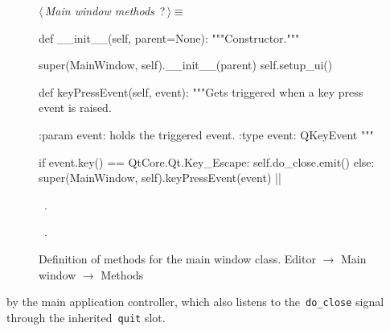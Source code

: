 \documentclass[%
    a4paper,    %
    justified,  %
    nobib,      %
    openany     %
]{tufte-book}
\makeatletter
\renewcommand{\label}[1]{\@tufte@label{##1}}%
\makeatother
\begin{document}
\begin{figure}
\begin{flushleft} \small
\begin{minipage}{\linewidth}\label{scrap17}\raggedright\small
{} $\langle\,${\itshape Main window methods}\nobreak\ {\footnotesize {?}}$\,\rangle\equiv$
\vspace{-1ex}
\begin{pythoncode}
def __init__(self, parent=None):
    """Constructor."""

    super(MainWindow, self).__init__(parent)
    self.setup_ui()

def keyPressEvent(self, event):
    """Gets triggered when a key press event is raised.

    :param event: holds the triggered event.
    :type  event: QKeyEvent
    """

    if event.key() == QtCore.Qt.Key_Escape:
        self.do_close.emit()
    else:
        super(MainWindow, self).keyPressEvent(event)
|\NWsep|
\end{pythoncode}
\vspace{1.5ex}
\footnotesize
\begin{list}{}{\setlength{\itemsep}{-\parsep}\setlength{\itemindent}{-\leftmargin}}
\item \NWtxtMacroDefBy\ .
\item \NWtxtMacroRefIn\ .

\item{}
\end{list}
\end{minipage}\vspace{4ex}
\end{flushleft}
\caption{Definition of methods for the main window class.
  \newline{}\newline{}Editor $\rightarrow$ Main window $\rightarrow$ Methods}
\label{editor:lst:main-window:methods}
\end{figure}


 by the main application
controller, which also listens to the~\verb=do_close= signal through the
inherited~\verb=quit= slot.
\end{document}
